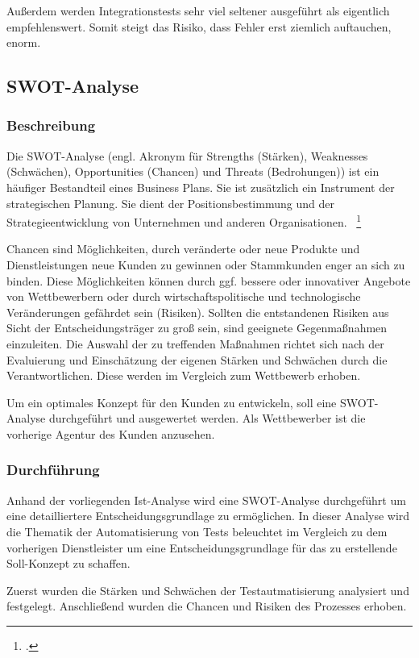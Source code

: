 Außerdem werden Integrationstests sehr viel seltener ausgeführt als eigentlich empfehlenswert. Somit steigt das Risiko, dass Fehler erst ziemlich auftauchen, enorm.  

\subsection{SWOT-Analyse}
\subsubsection{Beschreibung}
Die SWOT-Analyse (engl. Akronym für Strengths (Stärken), Weaknesses (Schwächen), Opportunities (Chancen) und Threats (Bedrohungen)) ist ein häufiger Bestandteil eines Business Plans. Sie ist zusätzlich ein Instrument der strategischen Planung. Sie dient der Positionsbestimmung und der Strategieentwicklung von Unternehmen und anderen Organisationen. ~\footcite[Vgl. Seite 240]{Meffert.2012}

Chancen sind Möglichkeiten, durch veränderte oder neue Produkte und Dienstleistungen neue Kunden zu gewinnen oder Stammkunden enger an sich zu binden. Diese Möglichkeiten können durch ggf. bessere oder innovativer Angebote von Wettbewerbern oder durch wirtschaftspolitische und technologische Veränderungen gefährdet sein (Risiken). Sollten die entstandenen Risiken aus Sicht der Entscheidungsträger zu groß sein, sind geeignete Gegenmaßnahmen einzuleiten. Die Auswahl der zu treffenden Maßnahmen richtet sich nach der Evaluierung und Einschätzung der eigenen Stärken und Schwächen durch die Verantwortlichen. Diese werden im Vergleich zum Wettbewerb erhoben.

Um ein optimales Konzept für den Kunden zu entwickeln, soll eine SWOT-Analyse durchgeführt und ausgewertet werden. Als Wettbewerber ist die vorherige Agentur des Kunden anzusehen.

\subsubsection{Durchführung}
Anhand der vorliegenden Ist-Analyse wird eine SWOT-Analyse durchgeführt um eine detailliertere Entscheidungsgrundlage zu ermöglichen. In dieser Analyse wird die Thematik der Automatisierung von Tests beleuchtet im Vergleich zu dem vorherigen Dienstleister um eine Entscheidungsgrundlage für das zu erstellende Soll-Konzept zu schaffen.

Zuerst wurden die Stärken und Schwächen der Testautmatisierung analysiert und festgelegt. Anschließend wurden die Chancen und Risiken des Prozesses erhoben. 

